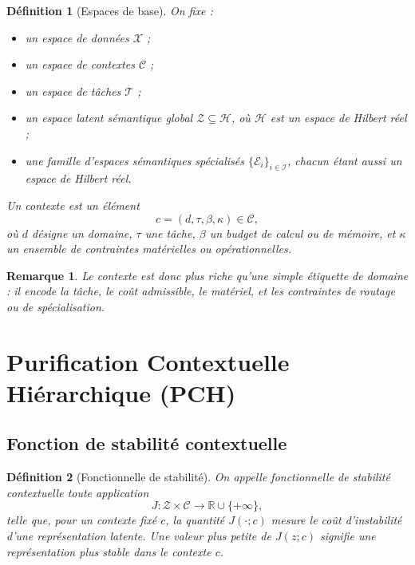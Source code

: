 \documentclass[11pt,a4paper]{article}
\newtheorem{definition}{Définition}[section]
\newtheorem{remark}{Remarque}[section]
\newcommand{\X}{\mathcal X}
\newcommand{\C}{\mathcal C}
\newcommand{\E}{\mathcal E}
\newcommand{\Z}{\mathcal Z}
\newcommand{\Hh}{\mathcal H}
\newcommand{\I}{\mathcal I}
\newcommand{\T}{\mathcal T}
\newcommand{\R}{\mathbb R}
\newcommand{\1}{\mathbf 1}
\begin{document}
\begin{definition}[Espaces de base]
On fixe :

\begin{itemize}[leftmargin=2em]
    \item un espace de données \(\X\) ;
    \item un espace de contextes \(\C\) ;
    \item un espace de tâches \(\T\) ;
    \item un espace latent sémantique global \(\Z \subseteq \Hh\), où \(\Hh\) est un espace de Hilbert réel ;
    \item une famille d'espaces sémantiques spécialisés \(\{\E_i\}_{i\in\I}\), chacun étant aussi un espace de Hilbert réel.
\end{itemize}

Un contexte est un élément
\[
c = (d,\tau,\beta,\kappa)\in \C,
\]
où \(d\) désigne un domaine, \(\tau\) une tâche, \(\beta\) un budget de calcul ou de mémoire, et \(\kappa\) un ensemble de contraintes matérielles ou opérationnelles.
\end{definition}

\begin{remark}
Le contexte est donc plus riche qu'une simple étiquette de domaine : il encode la tâche, le coût admissible, le matériel, et les contraintes de routage ou de spécialisation.
\end{remark}

\section{Purification Contextuelle Hiérarchique (PCH)}

\subsection{Fonction de stabilité contextuelle}

\begin{definition}[Fonctionnelle de stabilité]
On appelle \emph{fonctionnelle de stabilité contextuelle} toute application
\[
J : \Z \times \C \to \R \cup \{+\infty\},
\]
telle que, pour un contexte fixé \(c\), la quantité \(J(\cdot;c)\) mesure le coût d'instabilité d'une représentation latente.
Une valeur plus petite de \(J(z;c)\) signifie une représentation plus stable dans le contexte \(c\).
\end{definition}
\end{document}
